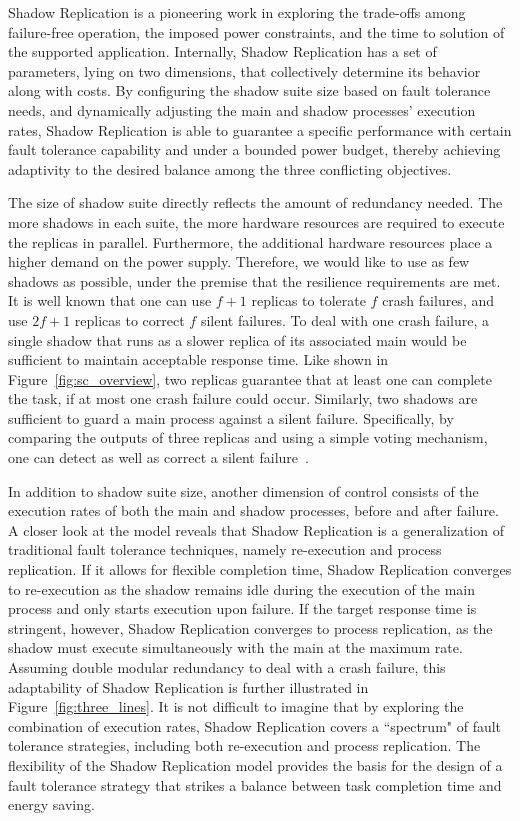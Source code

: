 Shadow Replication is a pioneering work in exploring the trade-offs among failure-free operation, the imposed power constraints, and the time to solution of the supported application. 
Internally, Shadow Replication has a set of parameters,    lying on two dimensions, that collectively determine its behavior along with costs. By configuring the shadow suite size based on fault tolerance needs, and dynamically adjusting the main and shadow processes' execution rates, Shadow Replication is able to guarantee a specific performance with certain fault tolerance capability and under a bounded power budget, thereby achieving adaptivity to the desired balance among the three conflicting objectives. 

The size of shadow suite directly reflects the amount of redundancy needed. The more shadows in each suite, the more hardware resources are required to execute the replicas in parallel. Furthermore, the additional hardware resources place a higher demand on the power supply. Therefore, we would like to use as few shadows as possible, under the premise that the resilience requirements are met. It is well known that one can use $f+1$ replicas to tolerate $f$ crash failures, and use $2f+1$ replicas to correct $f$ silent failures. To deal with one crash failure, a single shadow that runs as a slower replica of its associated main would be sufficient to maintain acceptable response time. Like shown in Figure~\ref{fig:sc_overview}, two replicas guarantee that at least one can complete the task, if at most one crash failure could occur. Similarly, two shadows are sufficient to guard a main process against a silent failure. Specifically, by comparing the outputs of three replicas and using a simple voting mechanism, one can detect as well as correct a silent failure~\cite{fiala_2012_sdc}. 

In addition to shadow suite size, another dimension of control consists of the execution rates of both the main and shadow processes, before and after failure. 
A closer look at the model reveals that Shadow
Replication is a generalization of traditional fault tolerance
techniques, namely re-execution and process replication. If it allows for flexible completion time, 
Shadow Replication converges to re-execution as
the shadow remains idle during the execution of the main process and
only starts execution upon failure. If the target response time is
stringent, however, Shadow Replication converges to process replication,
as the shadow must execute simultaneously with the main at the maximum
rate. Assuming double modular redundancy to deal with a crash failure, this adaptability of Shadow Replication is further illustrated in Figure~\ref{fig:three_lines}. 
It is not difficult to imagine that by exploring the combination of execution rates, Shadow Replication covers a ``spectrum" of fault tolerance strategies, including both re-execution and process replication. 
The flexibility of the Shadow Replication model provides the
basis for the design of a fault tolerance strategy that strikes a balance between task completion time and energy saving. 

